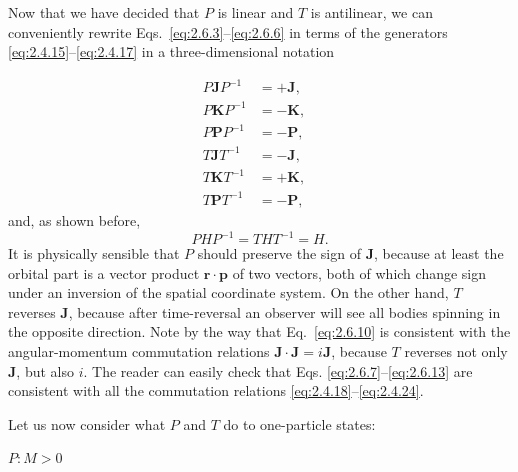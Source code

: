 \begin{sloppypar}
Now that we have decided that $P$ is linear and $T$ is antilinear, we can
conveniently rewrite Eqs.~\eqref{eq:2.6.3}--\eqref{eq:2.6.6} in terms of the generators
\eqref{eq:2.4.15}--\eqref{eq:2.4.17} in a three-dimensional notation
\end{sloppypar}
\begin{align}
P\mathbf{J}P^{-1}&=+\mathbf{J}, & \tag{2.6.7}\label{eq:2.6.7}\\
P\mathbf{K}P^{-1}&=-\mathbf{K}, & \tag{2.6.8}\label{eq:2.6.8}\\
P\mathbf{P}P^{-1}&=-\mathbf{P}, & \tag{2.6.9}\label{eq:2.6.9}\\
T\mathbf{J}T^{-1}&=-\mathbf{J}, & \tag{2.6.10}\label{eq:2.6.10}\\
T\mathbf{K}T^{-1}&=+\mathbf{K}, & \tag{2.6.11}\label{eq:2.6.11}\\
T\mathbf{P}T^{-1}&=-\mathbf{P}, & \tag{2.6.12}\label{eq:2.6.12}
\end{align}
and, as shown before,
\begin{equation}
PHP^{-1}=THT^{-1}=H.
\tag{2.6.13}\label{eq:2.6.13}
\end{equation}
It is physically sensible that $P$ should preserve the sign of $\mathbf{J}$,
because at least the orbital part is a vector product
$\mathbf{r}\cdot\mathbf{p}$ of two vectors, both of which change sign under
an inversion of the spatial coordinate system. On the other hand, $T$
reverses $\mathbf{J}$, because after time-reversal an observer will see all
bodies spinning in the opposite direction. Note by the way that Eq.~\eqref{eq:2.6.10}
is consistent with the angular-momentum commutation relations
$\mathbf{J}\cdot\mathbf{J}=i\mathbf{J}$, because $T$ reverses not only
$\mathbf{J}$, but also $i$. The reader can easily check that Eqs.
\eqref{eq:2.6.7}--\eqref{eq:2.6.13} are consistent with all the commutation relations
\eqref{eq:2.4.18}--\eqref{eq:2.4.24}.

Let us now consider what $P$ and $T$ do to one-particle states:

\medskip
\noindent\textbf{$P:M>0$}

